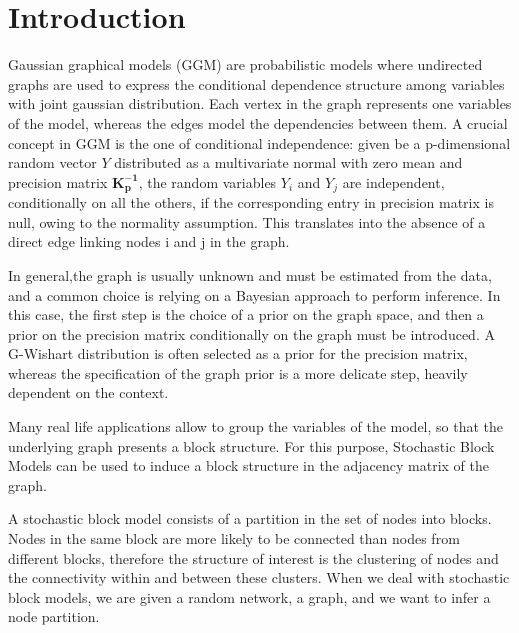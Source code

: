


\section{Introduction}

Gaussian graphical models (GGM) are probabilistic models where undirected graphs are used to express the conditional dependence structure among variables with joint gaussian distribution. Each vertex in the graph represents one variables of the model, whereas the edges model the dependencies between them. A crucial concept in GGM is the one of conditional independence: given be a p-dimensional random vector $Y$ distributed as a multivariate normal with zero mean and precision matrix $\mathbf{K_{p}^{-1}}$, the random variables $Y_i$ and $Y_j$ are independent, conditionally on all the others, if the corresponding entry in precision matrix  is null, owing to the normality assumption. This translates into the absence of a direct edge linking nodes i and j in the graph. 

In general,the graph is usually unknown and must be estimated from the data, and a common choice is relying on a Bayesian approach to perform inference. In this case, the first step is the choice of a prior on the graph space, and then a prior on the precision matrix conditionally on the graph must be introduced. A G-Wishart distribution is often selected as a prior for the precision matrix, whereas the specification of the graph prior is a more delicate step, heavily dependent on the context.

Many real life applications allow to group the variables of the model, so that the underlying graph presents a block structure. For this purpose, Stochastic Block Models can be used to induce a block structure in the adjacency matrix of the graph. 

A stochastic block model consists of a partition in the set of nodes into blocks. Nodes in the same block are more likely to be connected than nodes from different blocks, therefore the structure of interest is the clustering of nodes and the connectivity within and between these clusters.  When we deal with stochastic block models, we are given a random network, a graph, and we want to infer a node partition.


